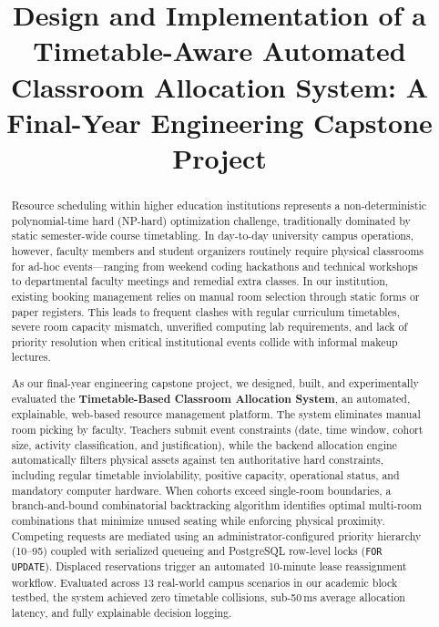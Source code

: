 \documentclass[conference]{IEEEtran}
\begin{document}
\title{Design and Implementation of a Timetable-Aware Automated Classroom Allocation System: A Final-Year Engineering Capstone Project}

\author{
}

\maketitle

\begin{abstract}
Resource scheduling within higher education institutions represents a non-deterministic polynomial-time hard (NP-hard) optimization challenge, traditionally dominated by static semester-wide course timetabling. In day-to-day university campus operations, however, faculty members and student organizers routinely require physical classrooms for ad-hoc events---ranging from weekend coding hackathons and technical workshops to departmental faculty meetings and remedial extra classes. In our institution, existing booking management relies on manual room selection through static forms or paper registers. This leads to frequent clashes with regular curriculum timetables, severe room capacity mismatch, unverified computing lab requirements, and lack of priority resolution when critical institutional events collide with informal makeup lectures. 

As our final-year engineering capstone project, we designed, built, and experimentally evaluated the \textbf{Timetable-Based Classroom Allocation System}, an automated, explainable, web-based resource management platform. The system eliminates manual room picking by faculty. Teachers submit event constraints (date, time window, cohort size, activity classification, and justification), while the backend allocation engine automatically filters physical assets against ten authoritative hard constraints, including regular timetable inviolability, positive capacity, operational status, and mandatory computer hardware. When cohorts exceed single-room boundaries, a branch-and-bound combinatorial backtracking algorithm identifies optimal multi-room combinations that minimize unused seating while enforcing physical proximity. Competing requests are mediated using an administrator-configured priority hierarchy (10--95) coupled with serialized queueing and PostgreSQL row-level locks (\texttt{FOR UPDATE}). Displaced reservations trigger an automated 10-minute lease reassignment workflow. Evaluated across 13 real-world campus scenarios in our academic block testbed, the system achieved zero timetable collisions, sub-50\,ms average allocation latency, and fully explainable decision logging.
\end{abstract}
\end{document}
